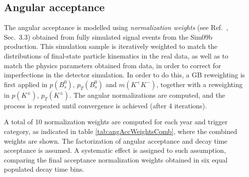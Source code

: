 
\subsection{Angular acceptance}
\label{subsec:AngAcc}
The angular acceptance is modelled using \textit{normalization weights} (see Ref.~\cite{LHCb-ANA-2012-067}, Sec.~3.3) obtained from fully simulated signal events from the Sim09b production. This simulation sample is iteratively weighted to match the distributions of final-state particle kinematics in the real data, as well as to match the physics parameters obtained from data, in order to correct for imperfections in the detector simulation. In order to do this, a GB reweighting is first applied in $p(B_s^0)$, $p_T(B_s^0)$ and $m(K^+K^-)$, together with a reweighting in $p(K^{\pm})$, $p_T(K^{\pm})$. The angular normalizations are computed, and the process is repeated until convergence is achieved (after 4 iterations).  

A total of 10 normalization weights are computed for each year and trigger category, as indicated in table \ref{tab:angAccWeightsComb}, where the combined weights are shown. The factorization of angular acceptance and decay time acceptance is assumed. A systematic effect is assigned to such assumption, comparing the final acceptance normalization weights obtained in six equal populated decay time bins.

